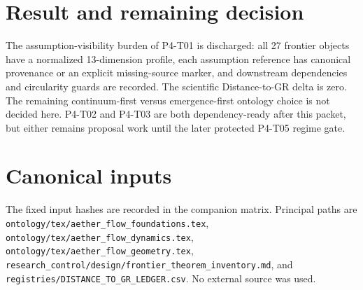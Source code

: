 \documentclass[11pt]{article}
\begin{document}
\section{Result and remaining decision}

The assumption-visibility burden of P4-T01 is discharged: all 27 frontier
objects have a normalized 13-dimension profile, each assumption reference has
canonical provenance or an explicit missing-source marker, and downstream
dependencies and circularity guards are recorded.  The scientific
Distance-to-GR delta is zero.  The remaining continuum-first versus
emergence-first ontology choice is not decided here.  P4-T02 and P4-T03 are
both dependency-ready after this packet, but either remains proposal work
until the later protected P4-T05 regime gate.

\section*{Canonical inputs}

The fixed input hashes are recorded in the companion matrix.  Principal paths
are \texttt{ontology/tex/aether\_flow\_foundations.tex},
\texttt{ontology/tex/aether\_flow\_dynamics.tex},
\texttt{ontology/tex/aether\_flow\_geometry.tex},
\texttt{research\_control/design/frontier\_theorem\_inventory.md}, and
\texttt{registries/DISTANCE\_TO\_GR\_LEDGER.csv}.  No external source was
used.
\end{document}
